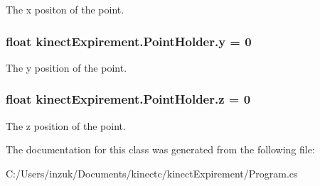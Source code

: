 The x positon of the point. 

\subsubsection[{\texorpdfstring{y}{y}}]{\setlength{\rightskip}{0pt plus 5cm}float kinect\+Expirement.\+Point\+Holder.\+y = 0}\hypertarget{classkinect_expirement_1_1_point_holder_a8e1920f1bd56b015aeae9f19a6f0c5e6}{}\label{classkinect_expirement_1_1_point_holder_a8e1920f1bd56b015aeae9f19a6f0c5e6}


The y position of the point. 

\subsubsection[{\texorpdfstring{z}{z}}]{\setlength{\rightskip}{0pt plus 5cm}float kinect\+Expirement.\+Point\+Holder.\+z = 0}\hypertarget{classkinect_expirement_1_1_point_holder_aa89b5a93efd8f6f6eb033ea7160c5d97}{}\label{classkinect_expirement_1_1_point_holder_aa89b5a93efd8f6f6eb033ea7160c5d97}


The z position of the point. 



The documentation for this class was generated from the following file\+:\begin{DoxyCompactItemize}
\item 
C\+:/\+Users/inzuk/\+Documents/kinectc/kinect\+Expirement/Program.\+cs\end{DoxyCompactItemize}
